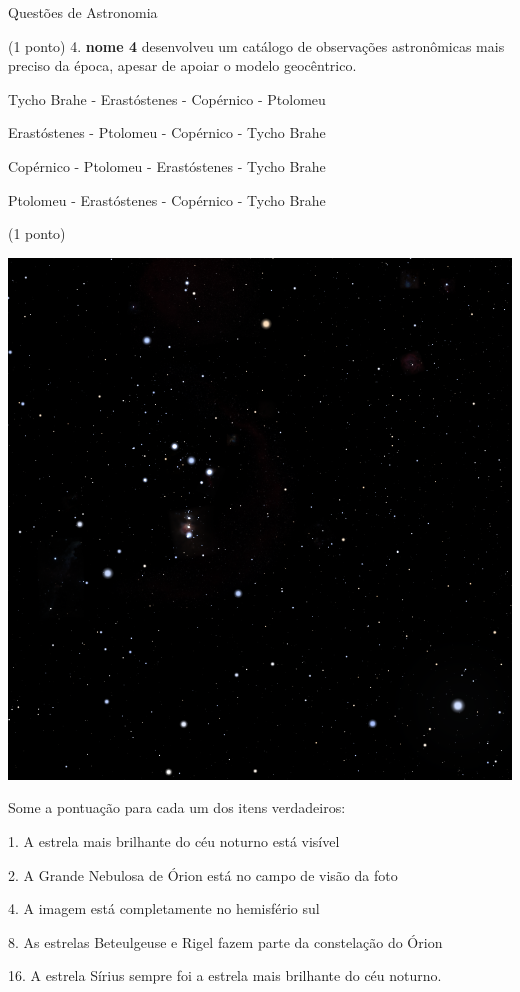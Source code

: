 \documentclass{../lista}
\begin{document}
\begin{secao}{Questões de Astronomia}
\begin{questao}{(1 ponto)}
			4. \textbf{nome 4} desenvolveu um catálogo de observações astronômicas mais preciso da época, apesar de apoiar o modelo geocêntrico.
			
			\begin{alternativas}
				\item Tycho Brahe - Erastóstenes - Copérnico - Ptolomeu
				\item Erastóstenes - Ptolomeu - Copérnico - Tycho Brahe
				\item Copérnico - Ptolomeu - Erastóstenes - Tycho Brahe
				\item Ptolomeu - Erastóstenes - Copérnico - Tycho Brahe
			\end{alternativas}
		\end{questao}

		\begin{questao}{(1 ponto)}
			\begin{center}
				\includegraphics[height=.75\linewidth]{./img/4.png}
			\end{center}
			
			Some a pontuação para cada um dos itens verdadeiros:
			
			1. A estrela mais brilhante do céu noturno está visível
			
			2. A Grande Nebulosa de Órion está no campo de visão da foto
			
			4. A imagem está completamente no hemisfério sul
			
			8. As estrelas Beteulgeuse e Rigel fazem parte da constelação do Órion
			
			16. A estrela Sírius sempre foi a estrela mais brilhante do céu noturno.
			

\end{questao}
\end{secao}
\end{document}
